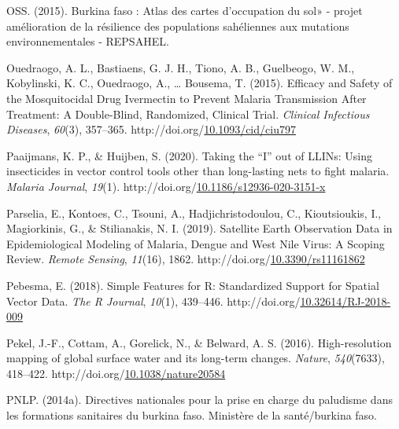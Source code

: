 \documentclass[12pt,twoside]{reedthesis}
\newlength{\cslhangindent}
\newenvironment{CSLReferences}[2] %
 {%
  \setlength{\parindent}{0pt}
  \ifodd #1 \everypar{\setlength{\hangindent}{\cslhangindent}}\ignorespaces\fi
  \ifnum #2 > 0
  \setlength{\parskip}{#2\baselineskip}
  \fi
 }%
 {}
\begin{document}
\begin{CSLReferences}{1}{0}
\leavevmode{}%
OSS. (2015). Burkina faso : Atlas des cartes d'occupation du sol» - projet amélioration de la résilience des populations sahéliennes aux mutations environnementales - REPSAHEL.

\leavevmode{}%
Ouedraogo, A. L., Bastiaens, G. J. H., Tiono, A. B., Guelbeogo, W. M., Kobylinski, K. C., Ouedraogo, A., \ldots{} Bousema, T. (2015). Efficacy and {Safety} of the {Mosquitocidal} {Drug} {Ivermectin} to {Prevent} {Malaria} {Transmission} {After} {Treatment}: {A} {Double}-{Blind}, {Randomized}, {Clinical} {Trial}. \emph{Clinical Infectious Diseases}, \emph{60}(3), 357--365. http://doi.org/\href{https://doi.org/10.1093/cid/ciu797}{10.1093/cid/ciu797}

\leavevmode{}%
Paaijmans, K. P., \& Huijben, S. (2020). Taking the {``{I}''} out of {LLINs}: Using insecticides in vector control tools other than long-lasting nets to fight malaria. \emph{Malaria Journal}, \emph{19}(1). http://doi.org/\href{https://doi.org/10.1186/s12936-020-3151-x}{10.1186/s12936-020-3151-x}

\leavevmode{}%
Parselia, E., Kontoes, C., Tsouni, A., Hadjichristodoulou, C., Kioutsioukis, I., Magiorkinis, G., \& Stilianakis, N. I. (2019). Satellite {Earth} {Observation} {Data} in {Epidemiological} {Modeling} of {Malaria}, {Dengue} and {West} {Nile} {Virus}: {A} {Scoping} {Review}. \emph{Remote Sensing}, \emph{11}(16), 1862. http://doi.org/\href{https://doi.org/10.3390/rs11161862}{10.3390/rs11161862}

\leavevmode{}%
Pebesma, E. (2018). Simple {Features} for {R}: {Standardized} {Support} for {Spatial} {Vector} {Data}. \emph{The R Journal}, \emph{10}(1), 439--446. http://doi.org/\href{https://doi.org/10.32614/RJ-2018-009}{10.32614/RJ-2018-009}

\leavevmode{}%
Pekel, J.-F., Cottam, A., Gorelick, N., \& Belward, A. S. (2016). High-resolution mapping of global surface water and its long-term changes. \emph{Nature}, \emph{540}(7633), 418--422. http://doi.org/\href{https://doi.org/10.1038/nature20584}{10.1038/nature20584}

\leavevmode{}%
PNLP. (2014a). Directives nationales pour la prise en charge du paludisme dans les formations sanitaires du burkina faso. Ministère de la santé/burkina faso.


\end{CSLReferences}
\end{document}
